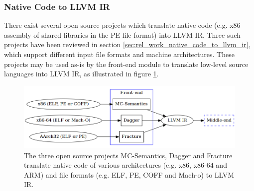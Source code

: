 
\subsubsection{Native Code to LLVM IR}
\label{sec:design_native_code_to_llvm_ir}

There exist several open source projects which translate native code (e.g. x86 assembly of shared libraries in the PE file format) into LLVM IR. Three such projects have been reviewed in section \ref{sec:rel_work_native_code_to_llvm_ir}, which support different input file formats and machine architectures. These projects may be used as-is by the front-end module to translate low-level source languages into LLVM IR, as illustrated in figure \ref{fig:front-end_binary}.

\begin{figure}[htbp]
	\begin{center}
		\includegraphics[width=\textwidth]{inc/6_design/front-end_binary.png}
		\caption{The three open source projects MC-Semantics, Dagger and Fracture translate native code of various architectures (e.g. x86, x86-64 and ARM) and file formats (e.g. ELF, PE, COFF and Mach-o) to LLVM IR.}
		\label{fig:front-end_binary}
	\end{center}
\end{figure}
